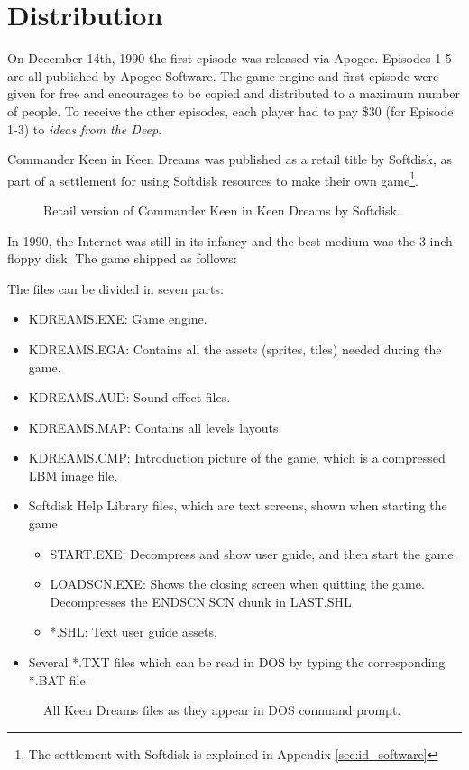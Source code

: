 \documentclass[book.tex]{subfiles}
\begin{document}
\section{Distribution}
On December 14th, 1990 the first episode was released via Apogee. Episodes 1-5 are all published by Apogee Software. The game engine and first episode were given for free and encourages to be copied and distributed to a maximum number of people. To receive the other episodes, each player had to pay \$30 (for Episode 1-3) to \textit{ideas from the Deep}.\\

\par
Commander Keen in Keen Dreams was published as a retail title by Softdisk, as part of a settlement for using Softdisk resources to make their own game\footnote{The settlement with Softdisk is explained in Appendix \ref{sec:id_software}}.\\

\par
\begin{figure}[H]
\centering
{}
\caption{Retail version of Commander Keen in Keen Dreams by Softdisk.}
\end{figure}
\par


In 1990, the Internet was still in its infancy and the best medium was the 3-inch floppy disk. The game shipped as follows:\\

  \par
 The files can be divided in seven parts:
\begin{itemize}
 \item KDREAMS.EXE: Game engine.
 \item KDREAMS.EGA: Contains all the assets (sprites, tiles) needed during the game.
 \item KDREAMS.AUD: Sound effect files.
 \item KDREAMS.MAP: Contains all levels layouts.
 \item KDREAMS.CMP: Introduction picture of the game, which is a compressed LBM image file.
 \item Softdisk Help Library files, which are text screens, shown when starting the game
 \begin{itemize}
   \item START.EXE: Decompress and show user guide, and then start the game.
   \item LOADSCN.EXE: Shows the closing screen when quitting the game. Decompresses the ENDSCN.SCN chunk in LAST.SHL
   \item *.SHL: Text user guide assets. 
 \end{itemize}
 \item Several *.TXT files which can be read in DOS by typing the corresponding *.BAT file. 

\end{itemize}

\par
 \begin{figure}[H]
\centering
 \caption{All Keen Dreams files as they appear in DOS command prompt.}
  \end{figure}
 \par
\end{document}
